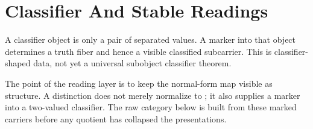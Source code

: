 \documentclass[11pt]{article}
\begin{document}
\section{Classifier And Stable Readings}

A classifier object is only a pair of separated values.  A marker into
that object determines a truth fiber and hence a visible classified
subcarrier.  This is classifier-shaped data, not yet a universal
subobject classifier theorem.

The point of the reading layer is to keep the normal-form map visible as
structure.  A distinction does not merely normalize to ;
it also supplies a marker into a two-valued classifier.  The raw category
below is built from these marked carriers before any quotient has
collapsed the presentations.
\end{document}
